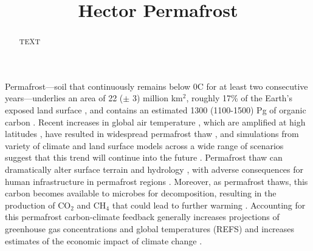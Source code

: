 \documentclass[essd, manuscript]{copernicus}
\begin{document}
\title{Hector Permafrost}








\received{}
\pubdiscuss{} %
\revised{}
\accepted{}
\published{}




\maketitle



\begin{abstract}
TEXT
\end{abstract}




\introduction
Permafrost---soil that continuously remains below 0\degree C for at least two consecutive years---underlies an area of 22 ($\pm$ 3) million km$^2$, roughly 17\% of the Earth's exposed land surface \citep{gruber_2012_derivation}, and contains an estimated 1300 (1100-1500) Pg of organic carbon \citep{hugelius_2014_estimated}.
Recent increases in global air temperature \citep{ipcc_ar5_wg1}, which are amplified at high latitudes \citep{pithan_2014_arctic}, have resulted in widespread permafrost thaw \citep{romanovsky_2010_permafrost}, and simulations from variety of climate and land surface models across a wide range of scenarios suggest that this trend will continue into the future \citep{koven_2013_analysis; chadburn_2017_observation}.
Permafrost thaw can dramatically alter surface terrain and hydrology \citep{jones_2013_quantifying; godin_2014_effects; necsoiu_2013_multitemporal}, with adverse consequences for human infrastructure in permafrost regions \citep{anisimov_1997_permafrost; nelson_2002_climate; larsen_2008_estimating}.
Moreover, as permafrost thaws, this carbon becomes available to microbes for decomposition, resulting in the production of CO$_2$ and CH$_4$ \citep{brown_2008_report; romanovsky_2010_thermal; bond-lamberty_2016_temperature} that could lead to further warming \citep{koven_2011_permafrost; schuur_2015_climate}. Accounting for this permafrost carbon-climate feedback generally increases projections of greenhouse gas concentrations and global temperatures (REFS) and increases estimates of the economic impact of climate change \citep{hope_2015_economic; yumashev_2019_climate; chen_2019_economic}.
\end{document}
